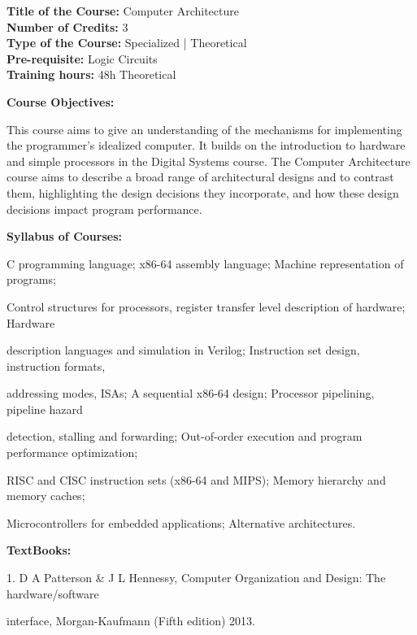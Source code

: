\documentclass[12pt,a4paper]{article}
\begin{document}
\newpage
\textbf{Title of the Course:} Computer Architecture\\
\textbf{Number of Credits:} 3\\
\textbf{Type of the Course:} Specialized | Theoretical\\
\textbf{Pre-requisite:} Logic Circuits\\
\textbf{Training hours:} 48h Theoretical\par\vspace{4pt}
\textbf{Course Objectives:}\par\vspace{2pt}
This course aims to give an understanding of the mechanisms for implementing the programmer's
idealized computer. It builds on the introduction to hardware and simple processors in the Digital
Systems course. The Computer Architecture course aims to describe a broad range of architectural
designs and to contrast them, highlighting the design decisions they incorporate, and how these
design decisions impact program performance.\par\vspace{4pt}
\textbf{Syllabus of Courses:}\par\vspace{2pt}
C programming language; x86-64 assembly language; Machine representation of programs;\par
Control structures for processors, register transfer level description of hardware; Hardware\par
description languages and simulation in Verilog; Instruction set design, instruction formats,\par
addressing modes, ISAs; A sequential x86-64 design; Processor pipelining, pipeline hazard\par
detection, stalling and forwarding; Out-of-order execution and program performance optimization;\par
RISC and CISC instruction sets (x86-64 and MIPS); Memory hierarchy and memory caches;\par
Microcontrollers for embedded applications; Alternative architectures.\par\vspace{4pt}
\textbf{TextBooks:}\par\vspace{2pt}
1. D A Patterson \& J L Hennessy, Computer Organization and Design: The hardware/software\par
interface, Morgan-Kaufmann (Fifth edition) 2013.\par
\vspace{4pt}
\end{document}
